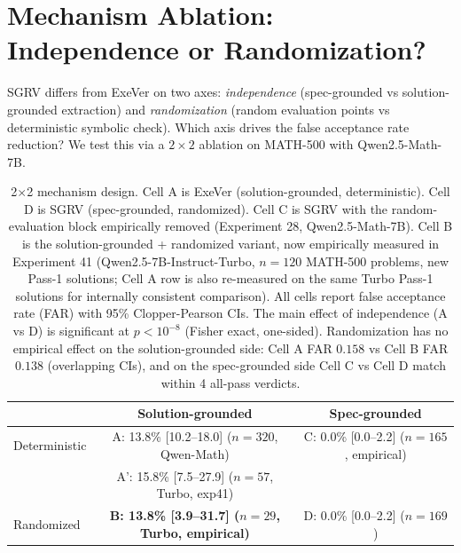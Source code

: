 \documentclass{article}
\begin{document}
\section{Mechanism Ablation: Independence or Randomization?}
\label{sec:ablation}

SGRV differs from ExeVer on two axes: \emph{independence} (spec-grounded vs solution-grounded extraction) and \emph{randomization} (random evaluation points vs deterministic symbolic check). Which axis drives the false acceptance rate reduction? We test this via a $2 \times 2$ ablation on MATH-500 with Qwen2.5-Math-7B.

\begin{table}[t]
\centering
\caption{2$\times$2 mechanism design. Cell A is ExeVer (solution-grounded, deterministic). Cell D is SGRV (spec-grounded, randomized). Cell C is SGRV with the random-evaluation block empirically removed (Experiment 28, Qwen2.5-Math-7B). Cell B is the solution-grounded + randomized variant, now empirically measured in Experiment 41 (Qwen2.5-7B-Instruct-Turbo, $n{=}120$ MATH-500 problems, new Pass-1 solutions; Cell A row is also re-measured on the same Turbo Pass-1 solutions for internally consistent comparison). All cells report false acceptance rate (FAR) with 95\% Clopper-Pearson CIs. The main effect of independence (A vs D) is significant at $p < 10^{-8}$ (Fisher exact, one-sided). Randomization has no empirical effect on the solution-grounded side: Cell A FAR $0.158$ vs Cell B FAR $0.138$ (overlapping CIs), and on the spec-grounded side Cell C vs Cell D match within 4 all-pass verdicts.}
\label{tab:ablation}
\small
\begin{tabular}{lcc}
\toprule
& Solution-grounded & Spec-grounded \\
\midrule
Deterministic & A: 13.8\% [10.2--18.0] ($n{=}320$, Qwen-Math) & C: 0.0\% [0.0--2.2] ($n{=}165$, empirical) \\
& A': 15.8\% [7.5--27.9] ($n{=}57$, Turbo, exp41) & \\
Randomized & \textbf{B: 13.8\% [3.9--31.7] ($n{=}29$, Turbo, empirical)} & D: 0.0\% [0.0--2.2] ($n{=}169$) \\
\bottomrule
\end{tabular}
\end{table}
\end{document}
